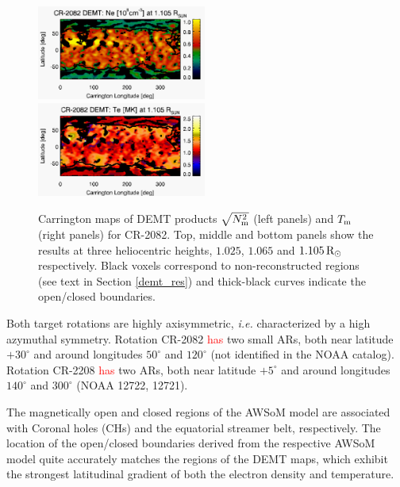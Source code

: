 \documentclass[namedreferences]{solarphysics}
\def\edit#1{\textcolor{Red}{#1}}
\newcommand{\mdeg}{^\circ}
\newcommand{\mrsun}{{\rm R_\odot}}
\newcommand{\Tm}{T_{\rm m}}
\newcommand{\Nsqm}{N^2_{{\rm m}}}
\newcommand{\sqravgN}{\sqrt{\Nsqm}}
\begin{document}
\begin{article}
\begin{figure}[h!]
\begin{center}
\includegraphics[width=0.495\textwidth]{figs/map_Ne_CR2082_DEMT-EUVI_behind_H1-L3523_r3d_1105_Rsun.pdf}
\includegraphics[width=0.495\textwidth]{figs/map_Tm_CR2082_DEMT-EUVI_behind_H1-L3523_r3d_1105_Rsun.pdf}
\caption{Carrington maps of DEMT {products $\sqravgN$} (left panels) and $\Tm$ (right panels) for CR-2082. Top, middle and bottom panels show the results at three heliocentric heights, $1.025$, $1.065$ and $1.105\,\mrsun$ respectively. Black voxels correspond to non-reconstructed regions (see text in Section \ref{demt_res}) and thick-black curves indicate the open/closed boundaries.}
\label{carmaps_demt_2082}
\end{center}
\end{figure}

{Both target rotations are highly axisymmetric, \textit{i.e.} characterized by a high azymuthal symmetry. Rotation CR-2082} \edit{has} two {small} ARs, both near latitude $+30\mdeg$ and {around longitudes} $50\mdeg$ and $120\mdeg$  {(not identified in the NOAA catalog)}. {Rotation CR-2208} \edit{has} two {ARs, both near latitude} $+5\mdeg$ and {around longitudes $140\mdeg$ and $300\mdeg$ {(NOAA 12722, 12721)}.} 

{The magnetically open and closed regions of the AWSoM model are associated with Coronal holes (CHs) and the equatorial streamer belt, respectively. The {location of the} open/closed boundaries derived from the respective AWSoM model quite accurately matches {the regions of the DEMT maps, which exhibit the strongest latitudinal gradient of both the electron density and temperature.}}


\end{article}
\end{document}
